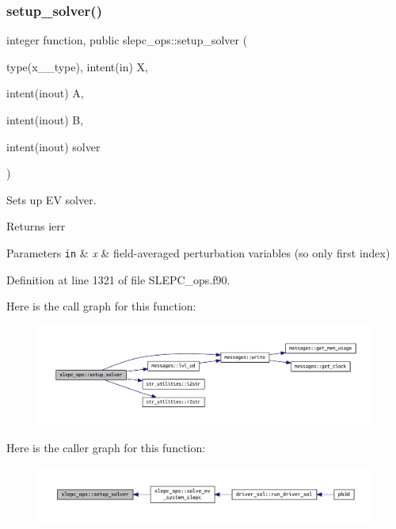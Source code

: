 \subsubsection{\texorpdfstring{setup\+\_\+solver()}{setup\_solver()}}
{\footnotesize\ttfamily integer function, public slepc\+\_\+ops\+::setup\+\_\+solver (\begin{DoxyParamCaption}\item[{type(x\+\_\+2\+\_\+type), intent(in)}]{X,  }\item[{intent(inout)}]{A,  }\item[{intent(inout)}]{B,  }\item[{intent(inout)}]{solver }\end{DoxyParamCaption})}



Sets up EV solver. 

\begin{DoxyReturn}{Returns}
ierr
\end{DoxyReturn}

\begin{DoxyParams}[1]{Parameters}
\mbox{\tt in}  & {\em x} & field-\/averaged perturbation variables (so only first index) \\
\hline
\end{DoxyParams}


Definition at line 1321 of file S\+L\+E\+P\+C\+\_\+ops.\+f90.

Here is the call graph for this function\+:\nopagebreak
\begin{figure}[H]
\begin{center}
\leavevmode
\includegraphics[width=350pt]{namespaceslepc__ops_af2eb258cbc9d353b95fa71d38570afad_cgraph}
\end{center}
\end{figure}
Here is the caller graph for this function\+:\nopagebreak
\begin{figure}[H]
\begin{center}
\leavevmode
\includegraphics[width=350pt]{namespaceslepc__ops_af2eb258cbc9d353b95fa71d38570afad_icgraph}
\end{center}
\end{figure}
\mbox{\label{namespaceslepc__ops_a79c420987056c225931b51c8d30ece1f}} 
